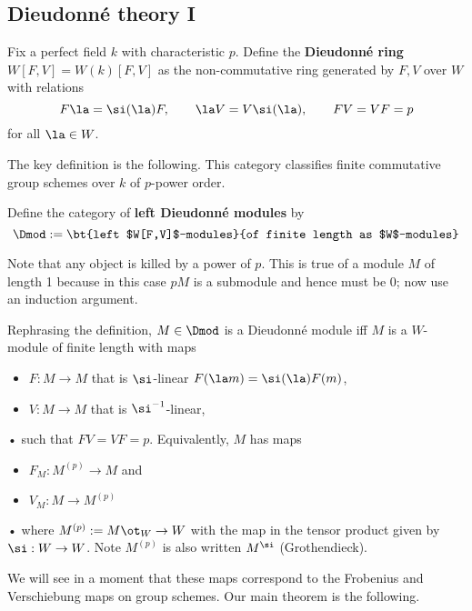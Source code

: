 \subsection{Dieudonn\'e theory I}
\begin{df}
Fix a perfect field $k$ with characteristic $p$. 
Define the \textbf{Dieudonn\'e ring} $W[F,V]=W(k)[F,V]$ as the non-commutative ring generated by $F,V$ over $W$ with relations
\[
F\la =\si(\la) F ,\qquad  \la V =V\si(\la) ,\qquad FV=VF=p
\]
for all $\la\in W$.
\end{df}
The key definition is the following. This category classifies finite commutative group schemes over $k$ of $p$-power order.

\begin{df}
Define the category of \textbf{left Dieudonn\'e modules} by
\[
\Dmod:=\bt{left $W[F,V]$-modules}{of finite length as $W$-modules}
\]
\end{df}
Note that any object is killed by a power of $p$. This is true of a module $M$ of length 1 because in this case $pM$ is a submodule and hence must be 0; now use an induction argument. %

Rephrasing the definition, $M\in \Dmod$ is a Dieudonn\'e module iff $M$ is a $W$-module of finite length with maps
\begin{itemize}
\item
$F:M\to M$ that is $\si$-linear $F(\la m)=\si(\la) F(m)$,
\item
$V:M \to M$ that is $\si^{-1}$-linear, 
\end{itemize}•
such that $FV=VF=p$. 
Equivalently, $M$ has maps
\begin{itemize}
\item
$F_M:M^{(p)}\to M$ and
\item
$V_M:M\to M^{(p)}$
\end{itemize}•
where $M^{(p)}:=M\ot_W\to W$ with the map in the tensor product given by $\si:W\to W$. Note $M^{(p)}$ is also written $M^{\si}$ (Grothendieck).

We will see in a moment that these maps correspond to the Frobenius and Verschiebung maps on group schemes.
Our main theorem is the following.

